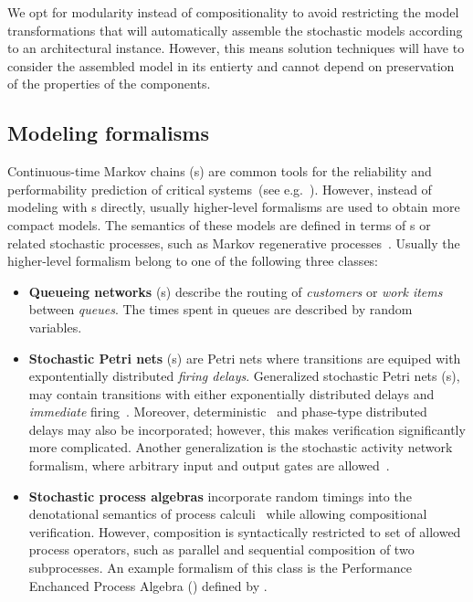 We opt for modularity instead of compositionality to avoid restricting the model transformations that will automatically assemble the stochastic models according to an architectural  instance. However, this means solution techniques will have to consider the assembled model in its entierty and cannot depend on preservation of the properties of the components.

\subsection{Modeling formalisms}

Continuous-time Markov chains (s) are common tools for the reliability and performability prediction of critical systems~(see e.g.~\cite{Reibman89markov}). However, instead of modeling with s directly, usually higher-level formalisms are used to obtain more compact models. The semantics of these models are defined in terms of s or related stochastic processes, such as Markov regenerative processes~\citep{Logothetis95mrm,Telek96mrm}. Usually the higher-level formalism belong to one of the following three classes:
\begin{itemize}
\item \textbf{Queueing networks} (s) describe the routing of \emph{customers} or \emph{work items} between \emph{queues}. The times spent in queues are described by random variables. 
\item \textbf{Stochastic Petri nets} (s) are Petri nets where transitions are equiped with expontentially distributed \emph{firing delays}. Generalized stochastic Petri nets (s), may contain transitions with either exponentially distributed delays and \emph{immediate} firing~\citep{Marsan84gspn}. Moreover, deterministic~\citep{Logothetis95mrm} and phase-type distributed~\citep{Longo13phasetype} delays may also be incorporated; however, this makes verification significantly more complicated. Another generalization is the stochastic activity network formalism, where arbitrary input and output gates are allowed~\citep{Sanders01san}.
\item \textbf{Stochastic process algebras} incorporate random timings into the denotational semantics of process calculi~\citep{Hermanns02algebra} while allowing compositional verification. However, composition is syntactically restricted to set of allowed process operators, such as parallel and sequential composition of two subprocesses. An example formalism of this class is the Performance Enchanced Process Algebra () defined by \citet{Hillston95pepa}.
\end{itemize}

